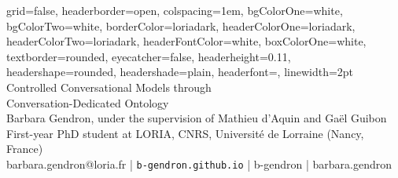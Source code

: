 \documentclass[a0paper,portrait]{baposter}
\begin{document}

\begin{poster}
{
grid=false,
headerborder=open, %
colspacing=1em, %
bgColorOne=white, %
bgColorTwo=white, %
borderColor=loriadark, %
headerColorOne=loriadark, %
headerColorTwo=loriadark, %
headerFontColor=white, %
boxColorOne=white, %
textborder=rounded, %
eyecatcher=false, %
headerheight=0.11\textheight, %
headershape=rounded, %
headershade=plain,
headerfont=\Large\textsf, %
linewidth=2pt %
}
{}
%
%
{\textsf{Controlled Conversational Models through \\ Conversation-Dedicated Ontology}}
{\sf\vspace{0.3em}\\
Barbara Gendron, under the supervision of Mathieu d'Aquin and Gaël Guibon
\vspace{0.1em}\\
\small{First-year PhD student at LORIA, CNRS, Université de Lorraine (Nancy, France)
\vspace{0.2em}\\
\faEnvelopeO \enspace barbara.gendron@loria.fr | \faDesktop \enspace \texttt{b-gendron.github.io} | \faGithub \enspace b-gendron | \faLinkedin \enspace barbara.gendron
}}
{
}%


\end{poster}
\end{document}
